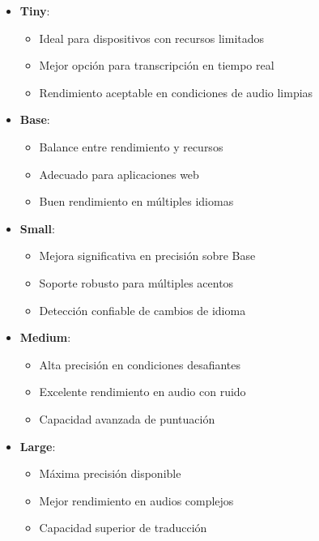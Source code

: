 \begin{itemize}
	\item \textbf{Tiny}:
	      \begin{itemize}
		      \item Ideal para dispositivos con recursos limitados
		      \item Mejor opción para transcripción en tiempo real
		      \item Rendimiento aceptable en condiciones de audio limpias
	      \end{itemize}

	\item \textbf{Base}:
	      \begin{itemize}
		      \item Balance entre rendimiento y recursos
		      \item Adecuado para aplicaciones web
		      \item Buen rendimiento en múltiples idiomas
	      \end{itemize}

	\item \textbf{Small}:
	      \begin{itemize}
		      \item Mejora significativa en precisión sobre Base
		      \item Soporte robusto para múltiples acentos
		      \item Detección confiable de cambios de idioma
	      \end{itemize}

	\item \textbf{Medium}:
	      \begin{itemize}
		      \item Alta precisión en condiciones desafiantes
		      \item Excelente rendimiento en audio con ruido
		      \item Capacidad avanzada de puntuación
	      \end{itemize}

	\item \textbf{Large}:
	      \begin{itemize}
		      \item Máxima precisión disponible
		      \item Mejor rendimiento en audios complejos
		      \item Capacidad superior de traducción
	      \end{itemize}
\end{itemize}

